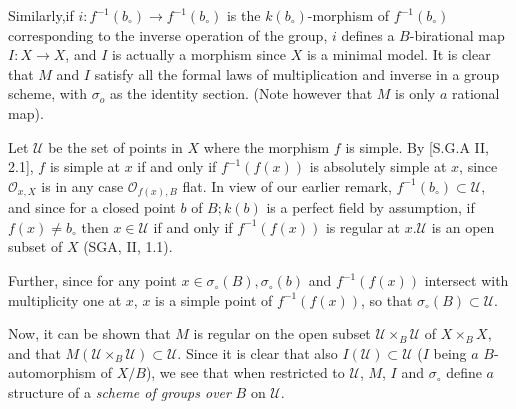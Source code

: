 Similarly,\pageoriginale if $i: f^{-1}(b_\circ) \rightarrow
f^{-1}(b_\circ)$ is the $k(b_\circ)$-morphism of $f^{-1}(b_\circ)$
corresponding to the inverse 
operation of the group, $i$ defines a  $B$-biratio\-nal map $I : X
\rightarrow X$, and $I$ is actually a morphism since $X$ is a minimal
model. It is clear that $M$  and $I$ satisfy all the  formal laws of
multiplication and inverse in a group scheme, with $\sigma_o$ as the
identity section. (Note however that $M$ is only $a$ rational map). 

Let $\mathscr{U}$ be the set of points in $X$   where the morphism
$f$ is simple. By [S.G.A II, 2.1], $f$ is simple at $x$ if and only if
$ f^{-1}(f (x))$ is absolutely simple at $x$, since $\mathscr O_{x,X}
$ is in any case $ \mathscr{O}_{f(x),B}$ flat. In view of our earlier
remark, $f^{-1}(b_\circ) \subset \mathscr{U} $, and   since for a closed
point $b$ of $B;k(b)$ is a  perfect field by  assumption, if
$f(x)\neq b_\circ$  then $ x \in \mathscr{U}$   if and only if $f^{-1}(f
(x))$ is regular at $x.\mathscr{U}$  is an open subset of $X$ (SGA, II,
1.1). 

Further, since for any point  $x \in \sigma_\circ (B), \sigma_\circ (b)$ and
$ f^{-1}(f (x))$ intersect with multiplicity one at $x$, $x$ is a simple
point of $ f^{-1}(f (x))$,  so that $ \sigma_\circ (B) \subset
\mathscr{U}$. 

Now, it can be shown that $M$ is regular on the open subset $
\mathscr{U} \times_B \mathscr{U}$ of $X \times_B X$, and that
$M(\mathscr{U} \times_B 
\mathscr{U} ) \subset \mathscr{U} $. Since it is clear that also
$I(\mathscr{U} ) \subset \mathscr{U}$ ($I$ being $a$ $B$-automorphism of
$X/B$),  we see that when restricted to $\mathscr{U}$, $M$, $I$
and $ \sigma_\circ$ define $a$ structure of a \textit{scheme of groups
  over } $B$ on $\mathscr {U}$. 

